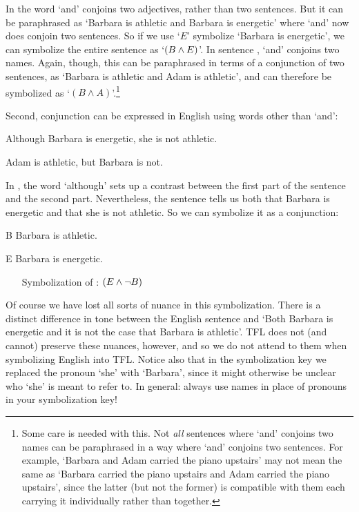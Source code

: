In  the word `and' conjoins two adjectives, rather than two sentences.  But it can be paraphrased as `Barbara is athletic and Barbara is energetic' where `and' now does conjoin two sentences.  So if we use `$E$' symbolize `Barbara is energetic', we can symbolize the entire sentence as `$(B\wedge E)$'.  In sentence , `and' conjoins two names.  Again, though, this can be paraphrased in terms of a conjunction of two sentences, as `Barbara is athletic and Adam is athletic', and can therefore be symbolized as `$(B \land A)$'.\footnote{Some care is needed with this.  Not \emph{all} sentences where `and' conjoins two names can be paraphrased in a way where `and' conjoins two sentences.  For example, `Barbara and Adam carried the piano upstairs' may not mean the same as `Barbara carried the piano upstairs and Adam carried the piano upstairs', since the latter (but not the former) is compatible with them each carrying it individually rather than together. }

Second, conjunction can be expressed in English using words other than `and':

	\begin{earg}
	\item[\ex{and6}]Although Barbara is energetic, she is not athletic.
	\item[\ex{and7}]Adam is athletic, but Barbara is not.
	\end{earg}

In , the word `although' sets up a contrast between the first part of the sentence and the second part. Nevertheless, the sentence tells us both that Barbara is energetic and that she is not athletic.  So we can symbolize it as a conjunction:

\begin{ekey}
		\item[B] Barbara is athletic.
		\item[E] Barbara is energetic.
\end{ekey}

\begin{itemize}
\item[] Symbolization of : $(E \wedge \neg B)$
\end{itemize}

Of course we have lost all sorts of nuance in this symbolization. There is a distinct difference in tone between the English sentence  and `Both Barbara is energetic and it is not the case that Barbara is athletic'. TFL does not (and cannot) preserve these nuances, however, and so we do not attend to them when symbolizing English into TFL.  Notice also that in the symbolization key we replaced the pronoun `she' with `Barbara', since it might otherwise be unclear who `she' is meant to refer to.  In general: always use names in place of pronouns in your symbolization key!


